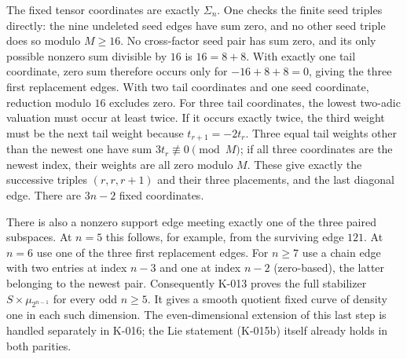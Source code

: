 The fixed tensor coordinates are exactly $\Sigma_n$.  One checks
the finite seed triples directly: the nine undeleted seed edges
have sum zero, and no other seed triple does so modulo $M\ge16$.
No cross-factor seed pair has sum zero, and its only possible
nonzero sum divisible by $16$ is $16=8+8$.  With exactly one tail
coordinate, zero sum therefore occurs only for $-16+8+8=0$,
giving the three first replacement edges.  With two
tail coordinates and one seed coordinate, reduction modulo $16$
excludes zero.  For three tail coordinates, the lowest two-adic
valuation must occur at least twice.  If it occurs exactly twice,
the third weight must be the next tail weight because
$t_{r+1}=-2t_r$.  Three equal tail weights other than the newest
one have sum $3t_r\not\equiv0\pmod M$; if all three coordinates are the newest index,
their weights are all zero modulo $M$.  These give exactly the
successive triples $(r,r,r+1)$ and their three placements, and
the last diagonal edge.  There are $3n-2$ fixed coordinates.

There is also a nonzero support edge meeting exactly one of the
three paired subspaces.  At $n=5$ this follows, for example, from
the surviving edge $121$.  At $n=6$ use one of the three first
replacement edges.  For $n\ge7$ use a chain edge with two entries
at index $n-3$ and one at index $n-2$ (zero-based), the latter
belonging to the newest pair.  Consequently K-013 proves the full
stabilizer $S\times\mu_{2^{n-1}}$ for every odd $n\ge5$.
It gives a smooth quotient fixed curve of density one in each such
dimension.  The even-dimensional extension of this last step is
handled separately in K-016; the Lie statement (K-015b) itself
already holds in both parities.
